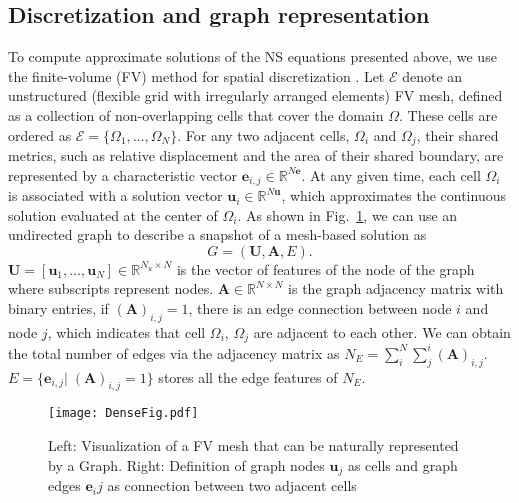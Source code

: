 \documentclass{article}
\begin{document}
\subsection{Discretization and graph representation}
\label{sec:disandgraph}
To compute approximate solutions of the NS equations presented above, we use the finite-volume (FV) method for spatial discretization \cite{moukalled2016finite}. Let $\mathcal{E}$ denote an unstructured (flexible grid with irregularly arranged elements) FV mesh, defined as a collection of non-overlapping cells that cover the domain $\Omega$. These cells are ordered as $\mathcal{E} = \{\Omega_1, \dots, \Omega_N\}$. For any two adjacent cells, $\Omega_i$ and $\Omega_j$, their shared metrics, such as relative displacement and the area of their shared boundary, are represented by a characteristic vector $\mathbf{e}_{i,j} \in \mathbb{R}^{N\mathbf{e}}$. At any given time, each cell $\Omega_i$ is associated with a solution vector $\mathbf{u}_i \in \mathbb{R}^{N\mathbf{u}}$, which approximates the continuous solution evaluated at the center of $\Omega_i$.
As shown in Fig.~\ref{fig:graphrepresentation}, we can use an undirected graph to describe a snapshot of a mesh-based solution as \begin{equation}
        G = (\mathbf{U},\mathbf{A},E).
        \label{eq:graph}
    \end{equation}
 $\mathbf{U}=[\mathbf{u}_1,\dots,\mathbf{u}_N]\in\mathbb{R}^{N_u\times N}$ is the vector of features of the node of the graph where subscripts represent nodes. $\mathbf{A}\in\mathbb{R}^{N\times N}$ is the graph adjacency matrix with binary entries, if $(\mathbf{A})_{i,j}=1$, there is an edge connection between node $i$ and node $j$, which indicates that cell $\Omega_i$, $\Omega_j$ are adjacent to each other. We can obtain the total number of edges via the adjacency matrix as $N_E=\sum_{i}^N \sum_{j}^i (\mathbf{A})_{i,j}$. $E=\{\mathbf{e}_{i,j}|\;(\mathbf{A})_{i,j}=1\}$ stores all the edge features of $N_E$. 
 
\begin{figure}[t]
    \centering
    \texttt{[image: DenseFig.pdf]}
    \caption{Left: Visualization of a FV mesh that can be naturally represented by a Graph. Right: Definition of graph nodes $\boldsymbol{u}_j$ as cells and graph edges $\boldsymbol{e}_ij$ as connection between two adjacent cells}
    \label{fig:graphrepresentation}
\end{figure}
\end{document}
